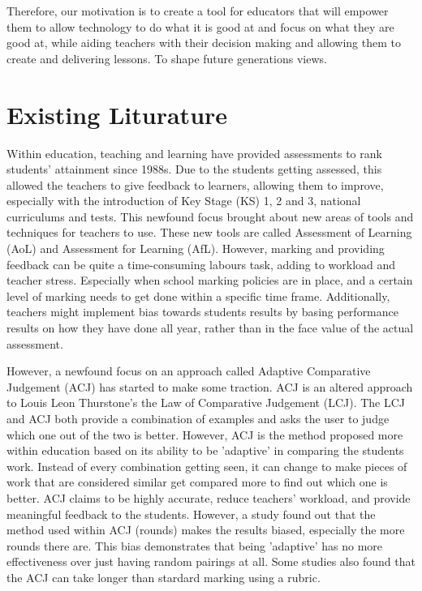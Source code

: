 	Therefore, our motivation is to create a tool for educators that will empower them to allow technology to do what it is good at and focus on what they are good at, while aiding teachers with their decision making and allowing them to create and delivering lessons. To shape future generations views.




	\section{Existing Liturature}
	Within education, teaching and learning have provided assessments to rank students' attainment since 1988s. Due to the students getting assessed, this allowed the teachers to give feedback to learners, allowing them to improve, especially with the introduction of Key Stage (KS) 1, 2 and 3, national curriculums and tests. This newfound focus brought about new areas of tools and techniques for teachers to use. These new tools are called Assessment of Learning (AoL) and Assessment for Learning (AfL). However, marking and providing feedback can be quite a time-consuming labours task, adding to workload and teacher stress. Especially when school marking policies are in place, and a certain level of marking needs to get done within a specific time frame. Additionally, teachers might implement bias towards students results by basing performance results on how they have done all year, rather than in the face value of the actual assessment.
	
	However, a newfound focus on an approach called Adaptive Comparative Judgement (ACJ) has started to make some traction. ACJ is an altered approach to Louis Leon Thurstone's the Law of Comparative Judgement (LCJ). The LCJ and ACJ both provide a combination of examples and asks the user to judge which one out of the two is better. However, ACJ is the method proposed more within education based on its ability to be 'adaptive' in comparing the students work. Instead of every combination getting seen, it can change to make pieces of work that are considered similar get compared more to find out which one is better. ACJ  claims to be highly accurate, reduce teachers' workload, and provide meaningful feedback to the students. However, a study found out that the method used within ACJ (rounds) makes the results biased, especially the more rounds there are. This bias demonstrates that being 'adaptive' has no more effectiveness over just having random pairings at all. Some studies also found that the ACJ can take longer than stardard marking using a rubric.
	
